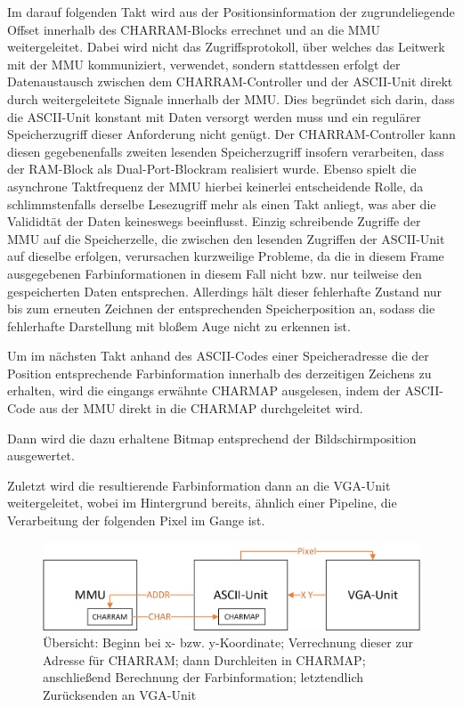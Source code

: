 Im darauf folgenden Takt wird aus der Positionsinformation der zugrundeliegende Offset innerhalb des CHARRAM-Blocks errechnet und an die MMU weitergeleitet. Dabei wird nicht das Zugriffsprotokoll, \"uber welches das Leitwerk mit der MMU kommuniziert, verwendet, sondern stattdessen erfolgt der Datenaustausch zwischen dem CHARRAM-Controller und der ASCII-Unit direkt durch weitergeleitete Signale innerhalb der MMU. Dies begr\"undet sich darin, dass die ASCII-Unit konstant mit Daten versorgt werden muss und ein regul\"arer Speicherzugriff dieser Anforderung nicht gen\"ugt. Der CHARRAM-Controller kann diesen gegebenenfalls zweiten lesenden Speicherzugriff insofern verarbeiten, dass der RAM-Block als Dual-Port-Blockram realisiert wurde. Ebenso spielt die asynchrone Taktfrequenz der MMU hierbei keinerlei entscheidende Rolle, da schlimmstenfalls derselbe Lesezugriff mehr als einen Takt anliegt, was aber die Valididt\"at der Daten keineswegs beeinflusst. Einzig schreibende Zugriffe der MMU auf die Speicherzelle, die zwischen den lesenden Zugriffen der ASCII-Unit auf dieselbe erfolgen, verursachen kurzweilige Probleme, da die in diesem Frame ausgegebenen Farbinformationen in diesem Fall nicht bzw. nur teilweise den gespeicherten Daten entsprechen. Allerdings h\"alt dieser fehlerhafte Zustand nur bis zum erneuten Zeichnen der entsprechenden Speicherposition an, sodass die fehlerhafte Darstellung mit blo\ss{}em Auge nicht zu erkennen ist.

Um im nächsten Takt anhand des ASCII-Codes einer Speicheradresse die der Position entsprechende Farbinformation innerhalb des derzeitigen Zeichens zu erhalten, wird die eingangs erw\"ahnte CHARMAP ausgelesen, indem der ASCII-Code aus der MMU direkt in die CHARMAP durchgeleitet wird. 

Dann wird die dazu erhaltene Bitmap entsprechend der Bildschirmposition ausgewertet. 

Zuletzt wird die resultierende Farbinformation dann an die VGA-Unit weitergeleitet, wobei im Hintergrund bereits, \"ahnlich einer Pipeline, die Verarbeitung der folgenden Pixel im Gange ist.

\begin{figure}[H]
	\centering
	\label{fig:overview}
		\includegraphics[width=1.0\textwidth]{ASCII.png}
	\caption[\"Ubersicht \"uber die ASCII-Unit]{\"Ubersicht: Beginn bei x- bzw. y-Koordinate; Verrechnung dieser zur Adresse f\"ur CHARRAM; dann Durchleiten in CHARMAP; anschlie\ss{}end Berechnung der Farbinformation; letztendlich Zur\"ucksenden an VGA-Unit}
\end{figure}

\newpage


